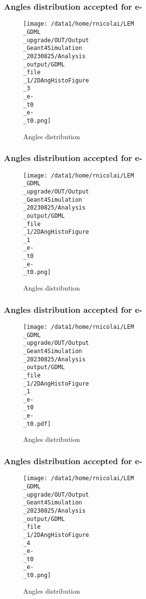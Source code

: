\documentclass[8pt]{beamer}
\begin{document}
            \begin{frame}
                \frametitle{Angles distribution accepted for e-}
            
        \begin{figure}[h]
            \centering
            \texttt{[image: /data1/home/rnicolai/LEM\\\_GDML\\\_upgrade/OUT/Output\\\_Geant4Simulation\\\_20230825/Analysis\\\_output/GDML\\\_file\\\_1/2DAngHistoFigure\\\_3\\\_e-\\\_t0\\\_e-\\\_t0.png]}
            \caption{Angles distribution}
        \end{figure}
        
            \end{frame}
            
            \begin{frame}
                \frametitle{Angles distribution accepted for e-}
            
        \begin{figure}[h]
            \centering
            \texttt{[image: /data1/home/rnicolai/LEM\\\_GDML\\\_upgrade/OUT/Output\\\_Geant4Simulation\\\_20230825/Analysis\\\_output/GDML\\\_file\\\_1/2DAngHistoFigure\\\_1\\\_e-\\\_t0\\\_e-\\\_t0.png]}
            \caption{Angles distribution}
        \end{figure}
        
            \end{frame}
            
            \begin{frame}
                \frametitle{Angles distribution accepted for e-}
            
        \begin{figure}[h]
            \centering
            \texttt{[image: /data1/home/rnicolai/LEM\\\_GDML\\\_upgrade/OUT/Output\\\_Geant4Simulation\\\_20230825/Analysis\\\_output/GDML\\\_file\\\_1/2DAngHistoFigure\\\_1\\\_e-\\\_t0\\\_e-\\\_t0.pdf]}
            \caption{Angles distribution}
        \end{figure}
        
            \end{frame}
            
            \begin{frame}
                \frametitle{Angles distribution accepted for e-}
            
        \begin{figure}[h]
            \centering
            \texttt{[image: /data1/home/rnicolai/LEM\\\_GDML\\\_upgrade/OUT/Output\\\_Geant4Simulation\\\_20230825/Analysis\\\_output/GDML\\\_file\\\_1/2DAngHistoFigure\\\_4\\\_e-\\\_t0\\\_e-\\\_t0.png]}
            \caption{Angles distribution}
        \end{figure}
        
            \end{frame}
            
\end{document}
